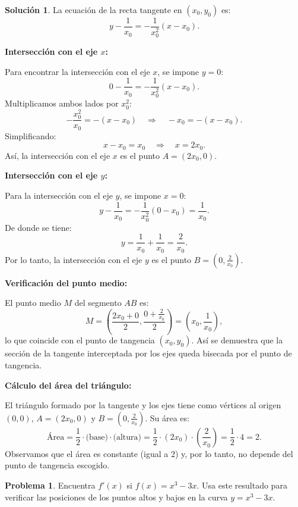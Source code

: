 \documentclass{article}
\theoremstyle{definition}
\newtheorem{problem}{Problema}
\newtheorem*{solution}{Solución}
\begin{document}
\begin{solution}
La ecuación de la recta tangente en \( (x_0, y_0) \) es:
\[
y - \frac{1}{x_0} = -\frac{1}{x_0^2}(x - x_0).
\]

\textbf{Intersección con el eje \(x\):}

Para encontrar la intersección con el eje \(x\), se impone \( y = 0 \):
\[
0 - \frac{1}{x_0} = -\frac{1}{x_0^2}(x - x_0).
\]
Multiplicamos ambos lados por \( x_0^2 \):
\[
-\frac{x_0^2}{x_0} = -(x - x_0) \quad \Longrightarrow \quad -x_0 = -(x - x_0).
\]
Simplificando:
\[
x - x_0 = x_0 \quad \Longrightarrow \quad x = 2x_0.
\]
Así, la intersección con el eje \(x\) es el punto \( A = (2x_0, 0) \).

\medskip

\textbf{Intersección con el eje \(y\):}

Para la intersección con el eje \(y\), se impone \( x = 0 \):
\[
y - \frac{1}{x_0} = -\frac{1}{x_0^2}(0 - x_0) = \frac{1}{x_0}.
\]
De donde se tiene:
\[
y = \frac{1}{x_0} + \frac{1}{x_0} = \frac{2}{x_0}.
\]
Por lo tanto, la intersección con el eje \(y\) es el punto \( B = \left(0, \frac{2}{x_0}\right) \).

\medskip

\textbf{Verificación del punto medio:}

El punto medio \( M \) del segmento \( AB \) es:
\[
M = \left( \frac{2x_0 + 0}{2}, \frac{0 + \frac{2}{x_0}}{2} \right) = \left( x_0, \frac{1}{x_0} \right),
\]
lo que coincide con el punto de tangencia \( (x_0, y_0) \). Así se demuestra que la sección de la tangente interceptada por los ejes queda bisecada por el punto de tangencia.

\medskip

\textbf{Cálculo del área del triángulo:}

El triángulo formado por la tangente y los ejes tiene como vértices al origen \( (0,0) \), \( A = (2x_0, 0) \) y \( B = \left(0, \frac{2}{x_0}\right) \). Su área es:
\[
\text{Área} = \frac{1}{2} \cdot \text{(base)} \cdot \text{(altura)} = \frac{1}{2} \cdot (2x_0) \cdot \left(\frac{2}{x_0}\right) = \frac{1}{2} \cdot 4 = 2.
\]
Observamos que el área es constante (igual a 2) y, por lo tanto, no depende del punto de tangencia escogido.

\end{solution}

\bigskip

\begin{problem}
Encuentra \( f'(x) \) si \( f(x) = x^3 - 3x \). Usa este resultado para verificar las posiciones de los puntos altos y bajos en la curva \( y = x^3 - 3x \).
\end{problem}
\end{document}
